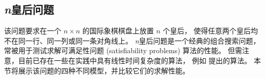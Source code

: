 %
%
%
%
%
%
%
%
\clearpage

\subsection{\emph{n}皇后问题}
\label{ssec:example:n-queens-problem}
该问题要求在一个 $n \times n$ 的国际象棋棋盘上放置 $n$ 个皇后，
使得任意两个皇后均不在同一行、同一列或同一条对角线上。
\emph{n}皇后问题是一个经典的组合搜索问题，
常被用于测试求解可满足性问题 (satisfiability problems) 算法的性能。
但需注意，目前已存在一些在实践中具有线性时间复杂度的算法，
例如 \cite{SosicGu1991} 提出的算法。
本节将展示该问题的四种不同模型，并比较它们的求解性能。

